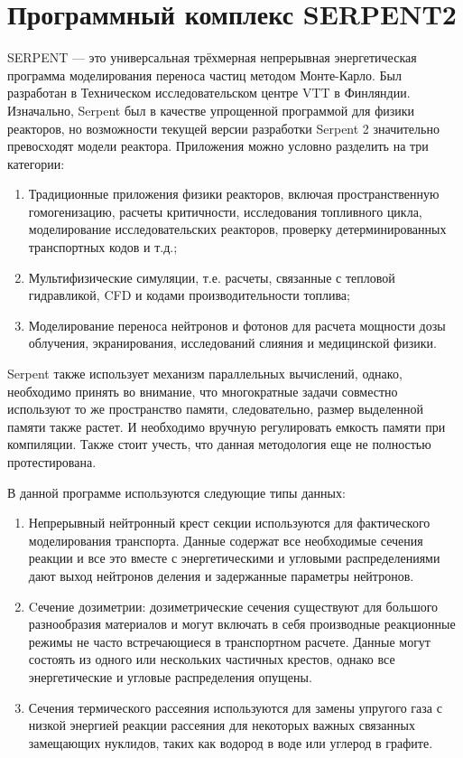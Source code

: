 \section{Программный комплекс SERPENT2}
SERPENT — это универсальная трёхмерная непрерывная энергетическая  программа моделирования переноса частиц методом Монте-Карло. Был разработан в Техническом исследовательском центре VTT в Финляндии. Изначально, Serpent был в качестве упрощенной программой для физики реакторов, но возможности текущей версии разработки Serpent 2 значительно превосходят модели реактора. Приложения можно условно разделить на три категории:

\begin{enumerate}
	\item Традиционные приложения физики реакторов, включая пространственную гомогенизацию, расчеты критичности, исследования топливного цикла, моделирование исследовательских реакторов, проверку детерминированных транспортных кодов и т.д.;
	\item Мультифизические симуляции, т.е. расчеты, связанные с тепловой гидравликой, CFD и кодами производительности топлива;
	\item Моделирование переноса нейтронов и фотонов для расчета мощности дозы облучения, экранирования, исследований слияния и медицинской физики.
\end{enumerate}

Serpent также использует механизм параллельных вычислений, однако, необходимо принять во внимание, что многократные задачи совместно используют то же пространство памяти, следовательно, размер выделенной памяти также растет. И необходимо вручную регулировать емкость памяти при компиляции. Также стоит учесть, что данная методология еще не полностью протестирована.

В данной программе используются следующие типы данных: 
\begin{enumerate}
	\item Непрерывный нейтронный крест секции используются для фактического моделирования транспорта. Данные содержат все необходимые
	сечения реакции и все это вместе с энергетическими и угловыми распределениями дают выход нейтронов деления и задержанные параметры нейтронов.
	\item Cечение дозиметрии: дозиметрические сечения существуют
	для большого разнообразия материалов и могут включать в себя производные реакционные режимы не часто
	встречающиеся в транспортном расчете. Данные могут состоять из одного или нескольких частичных крестов, однако все энергетические и угловые распределения опущены. 
	\item Сечения термического рассеяния используются для замены упругого газа с низкой энергией реакции рассеяния для некоторых важных связанных замещающих нуклидов, таких как водород в воде или углерод в графите.
\end{enumerate}

